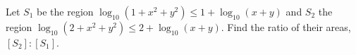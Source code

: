 Let $ S_1 $ be the region $\log_{10}(1+x^2+y^2)\le1+\log_{10}(x+y)$ and $ S_2 $ the region $\log_{10}(2+x^2+y^2)\le2+\log_{10}(x+y)$. Find the ratio of their areas, $[S_2]:[S_1]$.
